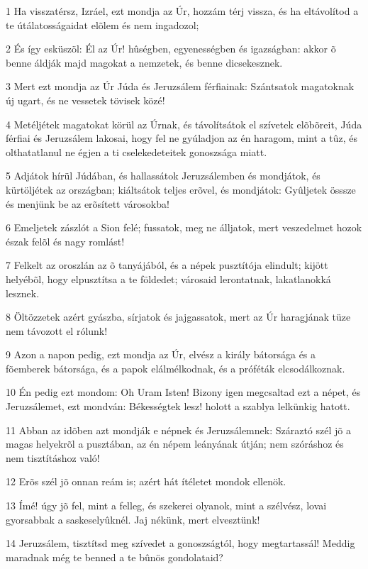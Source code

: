 \par 1 Ha visszatérsz, Izráel, ezt mondja az Úr, hozzám térj vissza, és ha eltávolítod a te útálatosságaidat elõlem és nem ingadozol;
\par 2 És így esküszöl: Él az Úr! hûségben, egyenességben és igazságban: akkor õ benne áldják majd magokat a nemzetek, és benne dicsekesznek.
\par 3 Mert ezt mondja az Úr Júda és Jeruzsálem férfiainak: Szántsatok magatoknak új ugart, és ne vessetek tövisek közé!
\par 4 Metéljétek magatokat körül az Úrnak, és távolítsátok el  szívetek elõbõreit, Júda férfiai és Jeruzsálem lakosai, hogy fel ne gyúladjon az én haragom, mint a tûz, és olthatatlanul ne égjen a ti cselekedeteitek gonoszsága miatt.
\par 5 Adjátok hírül Júdában, és hallassátok Jeruzsálemben és mondjátok, és kürtöljétek az országban; kiáltsátok teljes erõvel, és mondjátok: Gyûljetek össsze és menjünk be az erõsített városokba!
\par 6 Emeljetek zászlót a Sion felé; fussatok, meg ne álljatok, mert veszedelmet hozok észak felõl és nagy romlást!
\par 7 Felkelt az oroszlán az õ tanyájából, és a népek pusztítója elindult; kijött helyébõl, hogy elpusztítsa a te földedet; városaid lerontatnak, lakatlanokká lesznek.
\par 8 Öltözzetek azért gyászba, sírjatok és jajgassatok, mert az Úr haragjának tüze nem távozott el rólunk!
\par 9 Azon a napon pedig, ezt mondja az Úr, elvész a király bátorsága és a fõemberek bátorsága, és a papok elálmélkodnak, és a próféták elcsodálkoznak.
\par 10 Én pedig ezt mondom: Oh Uram Isten! Bizony igen megcsaltad ezt a népet, és Jeruzsálemet, ezt mondván: Békességtek lesz! holott a szablya lelkünkig hatott.
\par 11 Abban az idõben azt mondják e népnek és Jeruzsálemnek: Száraztó szél jõ a magas helyekrõl a pusztában, az én népem leányának útján; nem szóráshoz és nem tisztításhoz való!
\par 12 Erõs szél jõ onnan reám is; azért hát ítéletet mondok ellenök.
\par 13 Ímé! úgy jõ fel, mint a felleg, és szekerei olyanok, mint a szélvész, lovai gyorsabbak a saskeselyûknél. Jaj nékünk, mert elvesztünk!
\par 14 Jeruzsálem, tisztítsd meg szívedet a gonoszságtól, hogy megtartassál! Meddig maradnak még te benned a te bûnös gondolataid?
